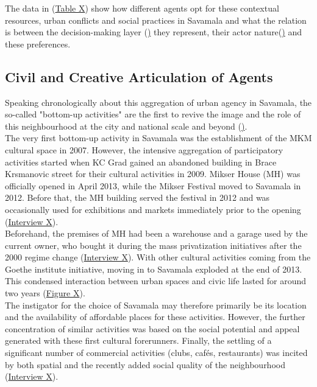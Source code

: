 \documentclass[11pt]{report}
\begin{document}
The data in (\href{Table 1}{Table X}) show how different agents opt for these contextual resources, urban conflicts and social practices in Savamala and what the relation is between the decision-making layer (\href{Section 4.2}\href{Section 4.2}) they represent, their actor nature(\href{Section 5.1}\href{Section 5.1}) and these preferences. 

\subsection{Civil and Creative Articulation of Agents}

Speaking chronologically about this aggregation of urban agency in Savamala, the so-called "bottom-up activities" are the first to revive the image and the role of this neighbourhood at the city and national scale and beyond (\href{Section 4.2.3}\href{Section 4.2.3}).
\\

The very first bottom-up activity in Savamala was the establishment of the MKM cultural space in 2007. However, the intensive aggregation of participatory activities started when KC Grad gained an abandoned building in Brace Krsmanovic street for their cultural activities in 2009. Mikser House (MH) was officially opened in April 2013, while the Mikser Festival moved to Savamala in 2012. Before that, the MH building served the festival in 2012 and was occasionally used for exhibitions and markets immediately prior to the opening 
(\href{InterviewX}{Interview X}).
\\

Beforehand, the premises of MH had been a warehouse and a garage used by the current owner, who bought it during the mass privatization initiatives after the 2000 regime change (\href{InterviewX}{Interview X}).
With other cultural activities coming from the Goethe institute initiative, moving in to Savamala exploded at the end of 2013. This condensed interaction between urban spaces and civic life lasted for around two years (\href{Figure 2}{Figure X}).
\\

The instigator for the choice of Savamala may therefore primarily be its location and the availability of affordable places for these activities. However, the further concentration of similar activities was based on the social potential and appeal generated with these first cultural forerunners. Finally, the settling of a significant number of commercial activities (clubs, cafés, restaurants) was incited by both spatial and the recently added social quality of the neighbourhood 
(\href{InterviewX}{Interview X}).
\\
\end{document}
